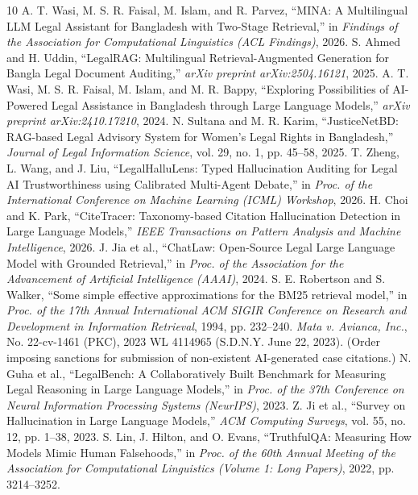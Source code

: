 \documentclass[conference]{IEEEtran}
\begin{document}
\begin{thebibliography}{10}
A. T. Wasi, M. S. R. Faisal, M. Islam, and R. Parvez, ``MINA: A Multilingual LLM Legal Assistant for Bangladesh with Two-Stage Retrieval,'' in \textit{Findings of the Association for Computational Linguistics (ACL Findings)}, 2026.
S. Ahmed and H. Uddin, ``LegalRAG: Multilingual Retrieval-Augmented Generation for Bangla Legal Document Auditing,'' \textit{arXiv preprint arXiv:2504.16121}, 2025.
A. T. Wasi, M. S. R. Faisal, M. Islam, and M. R. Bappy, ``Exploring Possibilities of AI-Powered Legal Assistance in Bangladesh through Large Language Models,'' \textit{arXiv preprint arXiv:2410.17210}, 2024.
N. Sultana and M. R. Karim, ``JusticeNetBD: RAG-based Legal Advisory System for Women's Legal Rights in Bangladesh,'' \textit{Journal of Legal Information Science}, vol. 29, no. 1, pp. 45--58, 2025.
T. Zheng, L. Wang, and J. Liu, ``LegalHalluLens: Typed Hallucination Auditing for Legal AI Trustworthiness using Calibrated Multi-Agent Debate,'' in \textit{Proc. of the International Conference on Machine Learning (ICML) Workshop}, 2026.
H. Choi and K. Park, ``CiteTracer: Taxonomy-based Citation Hallucination Detection in Large Language Models,'' \textit{IEEE Transactions on Pattern Analysis and Machine Intelligence}, 2026.
J. Jia et al., ``ChatLaw: Open-Source Legal Large Language Model with Grounded Retrieval,'' in \textit{Proc. of the Association for the Advancement of Artificial Intelligence (AAAI)}, 2024.
S. E. Robertson and S. Walker, ``Some simple effective approximations for the BM25 retrieval model,'' in \textit{Proc. of the 17th Annual International ACM SIGIR Conference on Research and Development in Information Retrieval}, 1994, pp. 232--240.
\textit{Mata v. Avianca, Inc.}, No. 22-cv-1461 (PKC), 2023 WL 4114965 (S.D.N.Y. June 22, 2023). (Order imposing sanctions for submission of non-existent AI-generated case citations.)
N. Guha et al., ``LegalBench: A Collaboratively Built Benchmark for Measuring Legal Reasoning in Large Language Models,'' in \textit{Proc. of the 37th Conference on Neural Information Processing Systems (NeurIPS)}, 2023.
Z. Ji et al., ``Survey on Hallucination in Large Language Models,'' \textit{ACM Computing Surveys}, vol. 55, no. 12, pp. 1--38, 2023.
S. Lin, J. Hilton, and O. Evans, ``TruthfulQA: Measuring How Models Mimic Human Falsehoods,'' in \textit{Proc. of the 60th Annual Meeting of the Association for Computational Linguistics (Volume 1: Long Papers)}, 2022, pp. 3214--3252.

\end{thebibliography}
\end{document}
